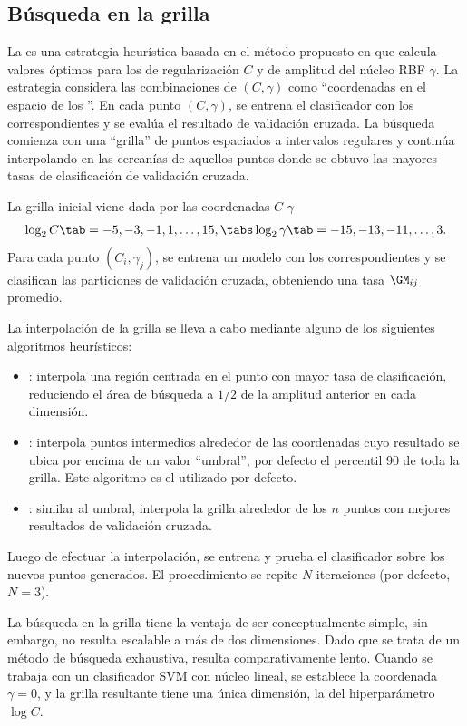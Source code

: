 %
%
\subsection{Búsqueda en la grilla}
%
La  es una estrategia heurística basada en el
método propuesto en \cite{hsu} que calcula valores óptimos para los
 de regularización $C$ y de amplitud del núcleo RBF
$\gamma$.
La estrategia considera las combinaciones de $(C,\gamma)$ como
``coordenadas en el espacio de los ''.
En cada punto $(C,\gamma)$, se entrena el clasificador con los
 correspondientes y se evalúa el resultado de validación
cruzada.
La búsqueda comienza con una ``grilla'' de puntos espaciados a
intervalos regulares y continúa interpolando en las cercanías de
aquellos puntos donde se obtuvo las mayores tasas de clasificación de
validación cruzada.

La grilla inicial viene dada por las coordenadas $C$-$\gamma$
%
\begin{align}
  \label{initial-grid}
  \log_2 C     \tab= -5, -3, -1, 1, \ldots, 15, \tabs
  \log_2\gamma \tab= -15,-13, -11, \ldots, 3.
\end{align}
%
Para cada punto $(C_i,\gamma_j)$, se entrena un modelo con los
 correspondientes y se clasifican las particiones de
validación cruzada, obteniendo una tasa ${\GM}_{ij}$ promedio.

La interpolación de la grilla se lleva a cabo mediante alguno de los
siguientes algoritmos heurísticos:
%
\begin{itemize}
\item
  : interpola una región centrada en el punto con mayor tasa
  de clasificación, reduciendo el área de búsqueda a $1/2$ de la
  amplitud anterior en cada dimensión.
\item
  : interpola puntos intermedios alrededor de las
  coordenadas cuyo resultado se ubica por encima de un valor
  ``umbral'', por defecto el percentil 90 de toda la grilla.
  Este algoritmo es el utilizado por defecto.
\item
  : similar al umbral, interpola la grilla alrededor de
  los $n$ puntos con mejores resultados de validación cruzada.
\end{itemize}
%
Luego de efectuar la interpolación, se entrena y prueba el
clasificador sobre los nuevos puntos generados.
El procedimiento se repite $N$ iteraciones (por defecto, $N=3$).

La búsqueda en la grilla tiene la ventaja de ser conceptualmente
simple, sin embargo, no resulta escalable a más de dos dimensiones.
Dado que se trata de un método de búsqueda exhaustiva, resulta
comparativamente lento.
Cuando se trabaja con un clasificador SVM con núcleo lineal, se
establece la coordenada $\gamma=0$, y la grilla resultante tiene una
única dimensión, la del hiperparámetro $\log C$.
